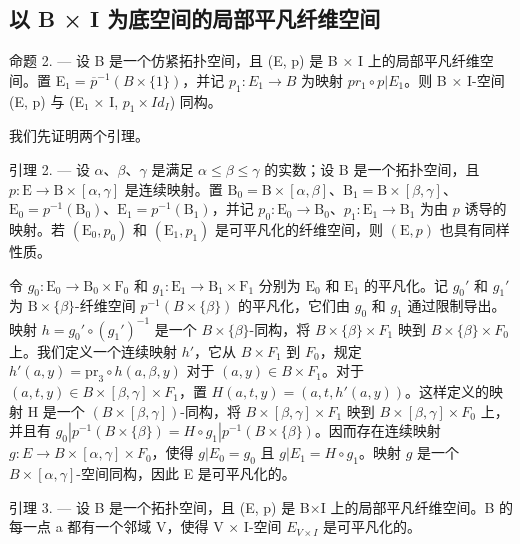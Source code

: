 \subsection{以 B × I 为底空间的局部平凡纤维空间}

命题 2. --- 设 B 是一个仿紧拓扑空间，且 (E, p) 是 B × I 上的局部平凡纤维空间。置 E₁ = \(\overline{p}^{-1}(B \times \{1\})\)，并记 \(p_{1}: E_{1} \to B\) 为映射 \(pr_{1} \circ p | E_{1}\)。则 B × I-空间 (E, p) 与 (E₁ × I, \(p_{1} \times Id_{I}\)) 同构。

我们先证明两个引理。

引理 2. --- 设 \(\alpha\)、\(\beta\)、\(\gamma\) 是满足 \(\alpha \leqslant \beta \leqslant \gamma\) 的实数；设 B 是一个拓扑空间，且 \(p: \mathrm{E} \to \mathrm{B} \times [\alpha, \gamma]\) 是连续映射。置 \(\mathrm{B}_0 = \mathrm{B} \times [\alpha, \beta]\)、\(\mathrm{B}_1 = \mathrm{B} \times [\beta, \gamma]\)、\(\mathrm{E}_0 = p^{-1}(\mathrm{B}_0)\)、\(\mathrm{E}_1 = p^{-1}(\mathrm{B}_1)\)，并记 \(p_0: \mathrm{E}_0 \to \mathrm{B}_0\)、\(p_1: \mathrm{E}_1 \to \mathrm{B}_1\) 为由 \(p\) 诱导的映射。若 \((\mathrm{E}_0, p_0)\) 和 \((\mathrm{E}_1, p_1)\) 是可平凡化的纤维空间，则 \((\mathrm{E}, p)\) 也具有同样性质。

令 \(g_0 \colon \mathrm{E}_0 \to \mathrm{B}_0 \times \mathrm{F}_0\) 和 \(g_1 \colon \mathrm{E}_1 \to \mathrm{B}_1 \times \mathrm{F}_1\) 分别为 \(\mathrm{E}_0\) 和 \(\mathrm{E}_1\) 的平凡化。记 \(g_0'\) 和 \(g_1'\) 为 \(\mathrm{B} \times \{\beta\}\)-纤维空间 \(p^{-1}(B \times \{\beta\})\) 的平凡化，它们由 \(g_0\) 和 \(g_1\) 通过限制导出。映射 \(h = g_0' \circ (g_1')^{-1}\) 是一个 \(B \times \{\beta\}\)-同构，将 \(B \times \{\beta\} \times F_1\) 映到 \(B \times \{\beta\} \times F_0\) 上。我们定义一个连续映射 \(h'\)，它从 \(B \times F_1\) 到 \(F_0\)，规定 \(h'(a, y) = \mathrm{pr}_3 \circ h(a, \beta, y)\) 对于 \((a, y) \in B \times F_1\)。对于 \((a, t, y) \in B \times [\beta, \gamma] \times F_1\)，置 \(H(a, t, y) = (a, t, h'(a, y))\)。这样定义的映射 H 是一个 \((B \times [\beta, \gamma])\)-同构，将 \(B \times [\beta, \gamma] \times F_1\) 映到 \(B \times [\beta, \gamma] \times F_0\) 上，并且有 \(g_0 | p^{-1}(B \times \{\beta\}) = H \circ g_1 | p^{-1}(B \times \{\beta\})\)。因而存在连续映射 \(g \colon E \to B \times [\alpha, \gamma] \times F_0\)，使得 \(g | E_0 = g_0\) 且 \(g | E_1 = H \circ g_1\)。映射 \(g\) 是一个 \(B \times [\alpha, \gamma]\)-空间同构，因此 E 是可平凡化的。

引理 3. --- 设 B 是一个拓扑空间，且 (E, p) 是 B×I 上的局部平凡纤维空间。B 的每一点 a 都有一个邻域 V，使得 V × I-空间 \(E_{V \times I}\) 是可平凡化的。

